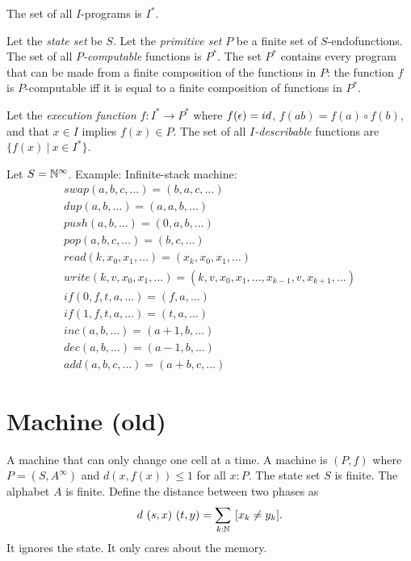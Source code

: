 The set of all \(I\)-programs is \(I^*\).

Let the \emph{state set} be \(S\).
Let the \emph{primitive set} \(P\) be a finite set of \(S\)-endofunctions.
The set of all \emph{\(P\)-computable} functions is \(P^*\).
The set \(P^*\) contains every program that can be made from a finite composition of the functions in \(P\):
the function \(f\) is \(P\)-computable iff it is equal to a finite composition of functions in \(P^*\).

Let the \emph{execution function} \(f : I^* \to P^*\)
where
\(f(\epsilon) = id\),
\(f(ab) = f(a) \circ f(b)\),
and that \(x \in I\) implies \(f(x) \in P\).
The set of all \emph{\(I\)-describable} functions are \(\{ f(x) ~|~ x \in I^* \}\).

Let \(S = \mathbb{N}^\infty\).
Example:
Infinite-stack machine:
\begin{align*}
    swap(a,b,c,\ldots) = (b,a,c,\ldots)
    \\
    dup(a,b,\ldots) = (a,a,b,\ldots)
    \\
    push(a,b,\ldots) = (0,a,b,\ldots)
    \\
    pop(a,b,c,\ldots) = (b,c,\ldots)
    \\
    read(k,x_0,x_1,\ldots) = (x_k,x_0,x_1,\ldots)
    \\
    write(k,v,x_0,x_1,\ldots) = (k,v,x_0,x_1,\ldots,x_{k-1},v,x_{k+1},\ldots)
    \\
    if(0,f,t,a,\ldots) = (f,a,\ldots)
    \\
    if(1,f,t,a,\ldots) = (t,a,\ldots)
    \\
    inc(a,b,\ldots) = (a+1,b,\ldots)
    \\
    dec(a,b,\ldots) = (a-1,b,\ldots)
    \\
    add(a,b,c,\ldots) = (a+b,c,\ldots)
\end{align*}

\section{Machine (old)}

A machine that can only change one cell at a time.
A machine is
\((P, f)\)
where \(P = (S,A^\infty)\)
and
\(d(x,f(x)) \le 1\)
for all \(x : P\).
The state set \(S\) is finite.
The alphabet \(A\) is finite.
Define the distance between two phases as
\begin{align}
    d~(s,x)~(t,y) = \sum_{k : \mathbb{N}} ~ [x_k \neq y_k].
\end{align}
It ignores the state.
It only cares about the memory.


